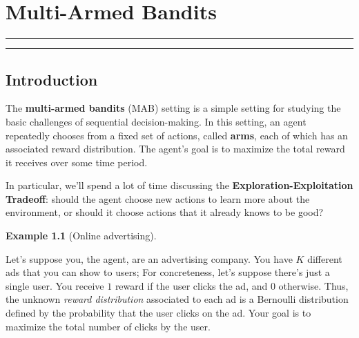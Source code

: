 \documentclass[
  letterpaper,
  DIV=11,
  numbers=noendperiod]{scrreprt}
\theoremstyle{plain}
\theoremstyle{plain}
\theoremstyle{definition}
\newtheorem{example}{Example}[chapter]
\theoremstyle{definition}
\theoremstyle{remark}
\begin{document}

\chapter{Multi-Armed Bandits}\label{sec-bandits}

\begin{center}\rule{0.5\linewidth}{0.5pt}\end{center}

\begin{center}\rule{0.5\linewidth}{0.5pt}\end{center}

\providecommand{\hi}{h}
\providecommand{\hor}{H}
\providecommand{\kl}[2]{\mathrm{KL}\left(#1\parallel#2\right)}
\providecommand{\ind}[1]{\mathbf{1}\left\{#1\right\}}
\providecommand{\st}{s}
\providecommand{\act}{a}
\providecommand{\E}{\mathbb{E}}
\providecommand{\R}{\mathbb{R}}
\providecommand{\pr}{\mathbb{P}}

\section{Introduction}\label{introduction-3}

The \textbf{multi-armed bandits} (MAB) setting is a simple setting for
studying the basic challenges of sequential decision-making. In this
setting, an agent repeatedly chooses from a fixed set of actions, called
\textbf{arms}, each of which has an associated reward distribution. The
agent's goal is to maximize the total reward it receives over some time
period.

In particular, we'll spend a lot of time discussing the
\textbf{Exploration-Exploitation Tradeoff}: should the agent choose new
actions to learn more about the environment, or should it choose actions
that it already knows to be good?

\begin{example}[Online
advertising]\protect\hypertarget{exm-advertising}{}\label{exm-advertising}

Let's suppose you, the agent, are an advertising company. You have \(K\)
different ads that you can show to users; For concreteness, let's
suppose there's just a single user. You receive \(1\) reward if the user
clicks the ad, and \(0\) otherwise. Thus, the unknown \emph{reward
distribution} associated to each ad is a Bernoulli distribution defined
by the probability that the user clicks on the ad. Your goal is to
maximize the total number of clicks by the user.

\end{example}
\end{document}
